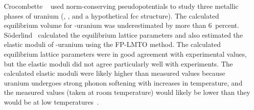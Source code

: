 %
Crocombette \etal~\cite{crocombette2001plane} used norm-conserving
pseudopotentials to study three metallic phases of uranium (\textalpha,
\textgamma, and a hypothetical fcc structure). The calculated equilibrium
volume for \textalpha-uranium was underestimated by more than 6~percent.
S{\"o}derlind~\cite{soderlind2002first} calculated the equilibrium lattice
parameters and also estimated the elastic moduli of
\textalpha-uranium using the FP-LMTO method. The calculated equilibrium
lattice parameters were in good agreement with experimental values, but
the elastic moduli did not agree particularly well with experiments. 
The calculated elastic moduli were likely higher than measured
values because uranium undergoes strong phonon softening with increases in
temperature, and the measured values (taken at room temperature) would
likely be lower than they would be at low
temperatures~\cite{lawson2000melting}.

